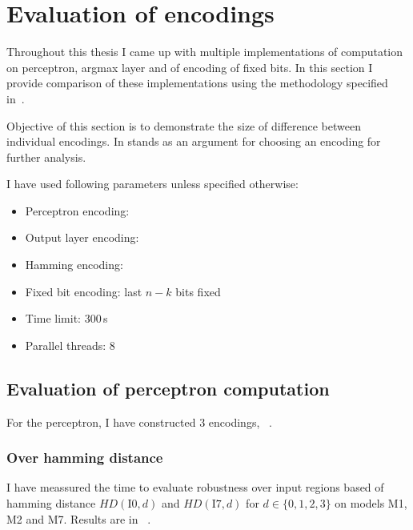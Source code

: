 \section{Evaluation of encodings}

Throughout this thesis I came up with multiple implementations of
computation on perceptron, argmax layer and of encoding of fixed bits.
In this section I provide comparison of these
implementations using the methodology specified in~.

Objective of this section is to demonstrate the size of difference between
individual encodings. In stands as an argument for choosing an encoding
for further analysis.

I have used following parameters unless specified otherwise:
\begin{itemize}
    \setlength{\itemsep}{0pt}
    \item Perceptron encoding: 
    \item Output layer encoding: 
    \item Hamming encoding: 
    \item Fixed bit encoding: last $n-k$ bits fixed
    \item Time limit: 300\,s
    \item Parallel threads: 8
\end{itemize}

\subsection{Evaluation of perceptron computation}

For the perceptron, I have constructed 3 encodings,%
~.

\subsubsection{Over hamming distance}

I have meassured the time to evaluate robustness over input regions
based of hamming distance $HD(\text{I0}, d)$ and $HD(\text{I7}, d)$
for $d\in\{0,1,2,3\}$ on models M1, M2 and M7. Results are in%
~.


